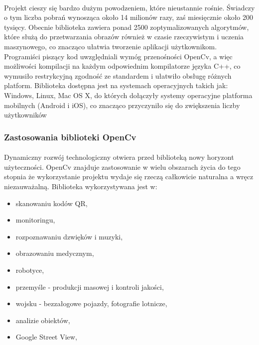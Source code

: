 \documentclass[a4paper,12pt]{article}
\begin{document}
			\paragraph{\indent}
				Projekt cieszy się bardzo dużym powodzeniem, które nieustannie rośnie. Świadczy o tym liczba pobrań 
				wynosząca około 14 milionów razy, zaś miesięcznie około 200 tysięcy.
				Obecnie biblioteka zawiera ponad 2500 zoptymalizowanych algorytmów, które służą do przetwarzania obrazów
				również w czasie rzeczywistym i uczenia maszynowego, co znacząco ułatwia tworzenie aplikacji użytkownikom. 
				Programiści piszący kod uwzględniali wymóg przenośności OpenCv, a więc możliwości kompilacji na każdym odpowiednim kompilatorze języka C++, co wymusiło restrykcyjną zgodność ze standardem i ułatwiło obsługę różnych platform.
				Biblioteka dostępna jest na systemach operacyjnych takich jak: Windows, Linux, Mac OS X, do których dołączyły systemy operacyjne platforma mobilnych (Android i iOS), co znacząco przyczyniło się do zwiększenia liczby użytkowników

		\subsubsection{Zastosowania biblioteki OpenCv}
			\paragraph{\indent} 
			    Dynamiczny rozwój technologiczny otwiera przed biblioteką nowy horyzont użyteczności. OpenCv znajduje zastosowanie w wielu obszarach życia do tego stopnia że wykorzystanie projektu wydaje się rzeczą całkowicie naturalna a wręcz niezauważalną. Biblioteka wykorzystywana jest w:
			
			    \begin{spacing}{1}
			        \begin{itemize}
        				\item skanowaniu kodów QR,
        				\item monitoringu,
        				\item rozpoznawaniu dzwięków i muzyki,
        				\item obrazowaniu medycznym,
        				\item robotyce,	
        				\item przemyśle - produkcji masowej i kontroli jakości,
        				\item wojsku - bezzałogowe pojazdy, fotografie lotnicze,
				        \item analizie obiektów,
				        \item Google Street View,
		            \end{itemize}
                \end{spacing}
    
\end{document}
